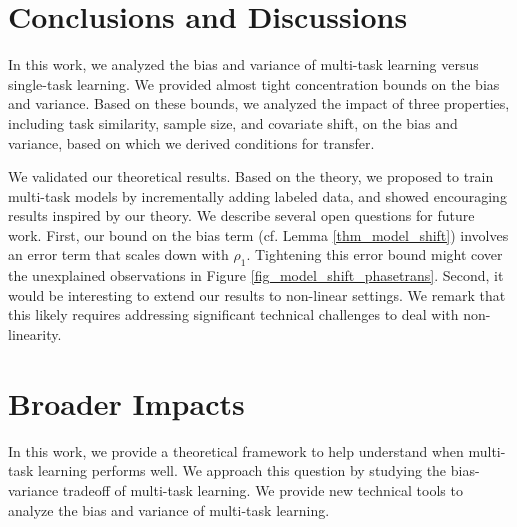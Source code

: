 

\section{Conclusions and Discussions}

In this work, we analyzed the bias and variance of multi-task learning versus single-task learning.
We provided almost tight concentration bounds on the bias and variance.
Based on these bounds, we analyzed the impact of three properties, including task similarity, sample size, and covariate shift, on the bias and variance, based on which we derived conditions for transfer.

We validated our theoretical results.
Based on the theory, we proposed to train multi-task models by incrementally adding labeled data, and showed encouraging results inspired by our theory.
We describe several open questions for future work.
First, our bound on the bias term (cf. Lemma \ref{thm_model_shift}) involves an error term that scales down with $\rho_1$.
Tightening this error bound might cover the unexplained observations in Figure \ref{fig_model_shift_phasetrans}.
Second, it would be interesting to extend our results to non-linear settings.
We remark that this likely requires addressing significant technical challenges  to deal with non-linearity.


\iffalse
\newpage
\section*{Broader Impacts}

In this work, we provide a theoretical framework to help understand when multi-task learning performs well.
We approach this question by studying the bias-variance tradeoff of multi-task learning.
We provide new technical tools to analyze the bias and variance of multi-task learning.

